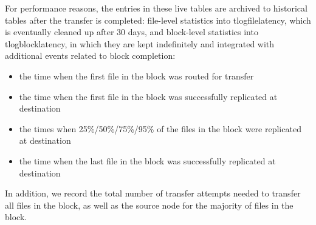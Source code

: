 For performance reasons, the entries in these live tables are archived to historical tables after the transfer is completed: file-level statistics into t\textunderscore log\textunderscore file\textunderscore latency, which is eventually cleaned up after 30 days, and block-level statistics into t\textunderscore log\textunderscore block\textunderscore latency, in which they are kept indefinitely and integrated with additional events related to block completion:
\begin{itemize}
\item the time when the first file in the block was routed for transfer
\item the time when the first file in the block was successfully replicated at destination
\item the times when 25\%/50\%/75\%/95\% of the files in the block were replicated at destination
\item the time when the last file in the block was successfully replicated at destination
\end{itemize}
In addition, we record the total number of transfer attempts needed to transfer all files in the block, as well as the source node for the majority of files in the block.
